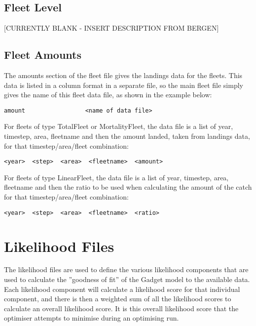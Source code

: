 \documentclass [a4paper, 10pt]{book}
\begin{document}
\section{Fleet Level}\label{sec:fleetlevel}
[CURRENTLY BLANK - INSERT DESCRIPTION FROM BERGEN]

\section{Fleet Amounts}\label{sec:fleetamount}
The amounts section of the fleet file gives the landings data for the fleets.  This data is listed in a column format in a separate file, so the main fleet file simply gives the name of this fleet data file, as shown in the example below:

{\small\begin{verbatim}
amount                 <name of data file>
\end{verbatim}}

For fleets of type TotalFleet or MortalityFleet, the data file is a list of year, timestep, area, fleetname and then the amount landed, taken from landings data, for that timestep/area/fleet combination:

{\small\begin{verbatim}
<year>  <step>  <area>  <fleetname>  <amount>
\end{verbatim}}

For fleets of type LinearFleet, the data file is a list of year, timestep, area, fleetname and then the ratio to be used when calculating the amount of the catch for that timestep/area/fleet combination:

{\small\begin{verbatim}
<year>  <step>  <area>  <fleetname>  <ratio>
\end{verbatim}}

\chapter{Likelihood Files}\label{chap:like}
The likelihood files are used to define the various likelihood components that are used to calculate the ''goodness of fit'' of the Gadget model to the available data.  Each likelihood component will calculate a likelihood score for that individual component, and there is then a weighted sum of all the likelihood scores to calculate an overall likelihood score.  It is this overall likelihood score that the optimiser attempts to minimise during an optimising run.
\end{document}

